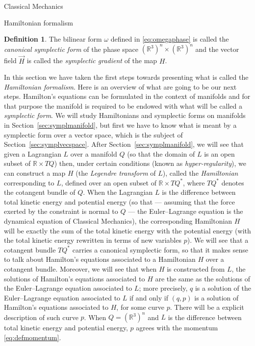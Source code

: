\documentclass[oneside,a4paper,11pt]{amsbook}
\newcommand{\R}{\mathds R}
\theoremstyle{remark}\newtheorem{exercise}{Exercise}[chapter]
\theoremstyle{plain}\newtheorem{teo}{Theorem}[section]
\theoremstyle{plain}\newtheorem{lem}[teo]{Lemma}
\theoremstyle{plain}\newtheorem{prop}[teo]{Proposition}
\theoremstyle{plain}\newtheorem{cor}[teo]{Corollary}
\theoremstyle{definition}\newtheorem{defin}[teo]{Definition}
\theoremstyle{remark}\newtheorem{rem}[teo]{Remark}
\theoremstyle{definition}\newtheorem{notation}[teo]{Notation}
\theoremstyle{definition}\newtheorem{convention}[teo]{Convention}
\theoremstyle{definition}\newtheorem{example}[teo]{Example}
\numberwithin{section}{chapter}
\numberwithin{equation}{section}
\begin{document}
\begin{chapter}{Classical Mechanics}
\begin{section}{Hamiltonian formalism}
\begin{defin}
The bilinear form $\omega$ defined in \eqref{eq:omegaphase} is called
the {\em canonical symplectic form\/} of the phase space $(\R^3)^n\times(\R^3)^n$ and the vector field $\vec H$ is
called the {\em symplectic gradient\/} of the map $H$.
\end{defin}

In this section we have taken the first steps towards presenting what is called the {\em Hamiltonian formalism}.
Here is an overview of what are going to be our next steps.
Hamilton's equations can be formulated in the context of manifolds and for that purpose the manifold is required to be
endowed with what will be called a {\em symplectic form}. We will study Hamiltonians and symplectic forms on manifolds in Section~\ref{sec:symplmanifold},
but first we have to know what is meant by a symplectic form over a vector space, which is the subject of
Section~\ref{sec:symplvecspace}. After Section~\ref{sec:symplmanifold}, we will see that given a Lagrangian
$L$ over a manifold $Q$ (so that the domain of $L$ is an open subset of $\R\times TQ$) then, under certain conditions
(known as {\em hyper-regularity}), we can construct a map $H$ (the {\em Legendre transform\/} of $L$), called the {\em Hamiltonian\/}
corresponding to $L$, defined over an open subset of $\R\times TQ^*$, where $TQ^*$ denotes the cotangent bundle of $Q$.
When the Lagrangian $L$ is the difference between total kinetic energy and potential energy (so that --- assuming that the force exerted by the
constraint is normal to $Q$ --- the Euler--Lagrange
equation is the dynamical equation of Classical Mechanics), the corresponding Hamiltonian $H$ will be exactly the sum
of the total kinetic energy with the potential energy (with the total kinetic energy rewritten in terms of new variables
$p$). We will see that a cotangent bundle $TQ^*$ carries a canonical symplectic form, so that it makes sense to talk
about Hamilton's equations associated to a Hamiltonian $H$ over a cotangent bundle.
Moreover, we will see that when $H$ is constructed from $L$, the solutions of Hamilton's equations
associated to $H$ are the same as the solutions of the Euler--Lagrange equation associated to $L$;
more precisely, $q$ is a solution of the Euler--Lagrange equation associated to $L$ if and only if
$(q,p)$ is a solution of Hamilton's equations associated to $H$, for some curve $p$. There will be a explicit
description of such curve $p$. When $Q=(\R^3)^n$ and $L$ is the difference between total kinetic energy and potential energy,
$p$ agrees with the momentum \eqref{eq:defmomentum}.


\end{section}
\end{chapter}
\end{document}
